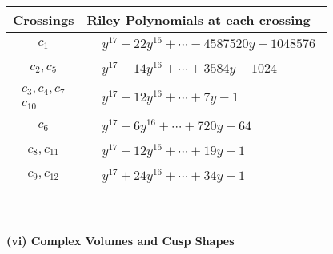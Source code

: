 \documentclass[1p]{elsarticle_modified}
\theoremstyle{definition}
\begin{document}
\begin{tabular}{m{50pt}|m{274pt}}
Crossings & \hspace{64pt}Riley Polynomials at each crossing \\
\hline $$\begin{aligned}c_{1}\end{aligned}$$&$\begin{aligned}
&y^{17}-22 y^{16}+\cdots-4587520 y-1048576
\end{aligned}$\\
\hline $$\begin{aligned}c_{2},c_{5}\end{aligned}$$&$\begin{aligned}
&y^{17}-14 y^{16}+\cdots+3584 y-1024
\end{aligned}$\\
\hline $$\begin{aligned}c_{3},c_{4},c_{7}\\c_{10}\end{aligned}$$&$\begin{aligned}
&y^{17}-12 y^{16}+\cdots+7 y-1
\end{aligned}$\\
\hline $$\begin{aligned}c_{6}\end{aligned}$$&$\begin{aligned}
&y^{17}-6 y^{16}+\cdots+720 y-64
\end{aligned}$\\
\hline $$\begin{aligned}c_{8},c_{11}\end{aligned}$$&$\begin{aligned}
&y^{17}-12 y^{16}+\cdots+19 y-1
\end{aligned}$\\
\hline $$\begin{aligned}c_{9},c_{12}\end{aligned}$$&$\begin{aligned}
&y^{17}+24 y^{16}+\cdots+34 y-1
\end{aligned}$\\
\hline
\end{tabular}\\~\\
\newpage\flushleft \textbf{(vi) Complex Volumes and Cusp Shapes}
\end{document}
